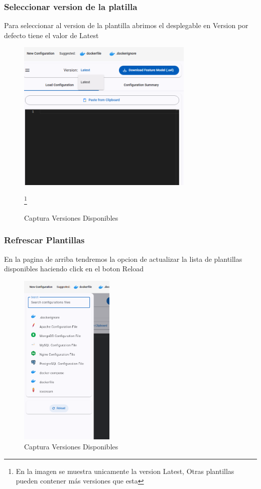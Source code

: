 \documentclass[12pt, a4paper, twoside]{article}
\begin{document}
\begin{umaappendices}
	\subsubsection{Seleccionar version de la platilla}
	Para seleccionar al version de la plantilla abrimos el desplegable en Version por defecto tiene el valor de Latest
	\begin{figure}[h]
		\centering
			\includegraphics[width=0.75\textwidth]{selectionVersion.png}
		\caption{Captura Versiones Disponibles} \footnote{En la imagen se muestra unicamente la version Latest, Otras plantillas pueden contener más versiones que esta}
	\end{figure}

	\newpage

	\subsubsection{Refrescar Plantillas}
	\label{sec:Actualizar Plantillas}
	En la pagina de arriba tendremos la opcion de actualizar la lista de plantillas disponibles haciendo click en el boton Reload

	\begin{figure}[h]
		\centering
			\includegraphics[width=0.4\textwidth]{RefreshTemplates.png}
		\caption{Captura Versiones Disponibles}
	\end{figure}


\end{umaappendices}
\end{document}

